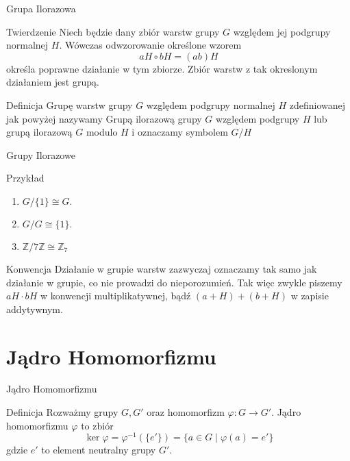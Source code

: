 \documentclass{beamer}
\let\phi\varphi
\begin{document}
\begin{frame}{Grupa Ilorazowa}
    \begin{block}{Twierdzenie}
        Niech będzie dany zbiór warstw grupy $G$ względem jej podgrupy normalnej $H$.
        Wówczas odwzorowanie określone wzorem
        $$aH \circ bH = (ab)H $$
        określa poprawne działanie w tym zbiorze. Zbiór warstw z tak okreslonym działaniem jest grupą.
    \end{block}
    \pause 
    \begin{block}{Definicja}
        Grupę warstw grupy $G$ względem podgrupy normalnej $H$ zdefiniowanej jak powyżej nazywamy
        \alert{Grupą ilorazową} grupy $G$ względem podgrupy $H$ lub grupą ilorazową $G$ modulo $H$ i oznaczamy symbolem $G/H$
    \end{block}
\end{frame}

\begin{frame}{Grupy Ilorazowe}
    \begin{exampleblock}{Przykład}
        \begin{enumerate}
            \item $G/\{1\} \cong G.$
            \item $G/G \cong \{1\}.$
            \item $\mathbb{Z} / 7\mathbb{Z} \cong \mathbb{Z}_7$
        \end{enumerate}
    \end{exampleblock}

\begin{alertblock}{Konwencja}
    Działanie w grupie warstw zazwyczaj oznaczamy tak samo jak działanie w grupie, co nie prowadzi do nieporozumień.
    Tak więc zwykle piszemy $aH \cdot bH$ w konwencji multiplikatywnej, bądź $(a + H) + (b + H)$ w zapisie addytywnym. 
\end{alertblock}
\end{frame}

\section{Jądro Homomorfizmu}

\begin{frame}{Jądro Homomorfizmu}
    \begin{block}{Definicja}
        Rozważmy grupy $G, G'$ oraz homomorfizm $\phi : G \rightarrow G'$. Jądro homomorfizmu $\phi$ to zbiór
        $$\ker \phi = \phi^{-1}(\{e'\}) = \{ a \in G \mid \phi(a) = e' \}  $$
        gdzie $e'$ to element neutralny grupy $G'$.
    \end{block}
\end{frame}
\end{document}
